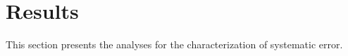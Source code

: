 \section{Results}\label{sec:results}

This section presents the analyses for the characterization of systematic error.